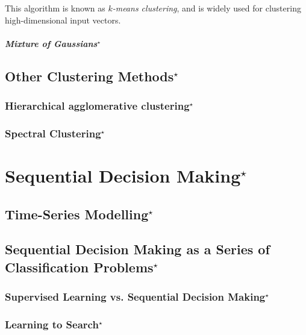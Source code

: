 \documentclass{report}
\newcommand{\todo}[1]{{\Large\textcolor{red}{#1}}}
\begin{document}
This algorithm is known as {\it $k$-means clustering}, and is widely used for
clustering high-dimensional input vectors. 




\paragraph{Mixture of Gaussians$^\star$}

\section{Other Clustering Methods$^\star$}

\subsection{Hierarchical agglomerative clustering$^\star$}

\subsection{Spectral Clustering$^\star$}


\chapter{Sequential Decision Making$^\star$}

\section{Time-Series Modelling$^\star$}
\label{sec:timeseries}


\section{Sequential Decision Making as a Series of Classification
Problems$^\star$}

\subsection{Supervised Learning vs. Sequential Decision Making$^\star$}

\subsection{Learning to Search$^\star$}

\todo{}











\end{document}
